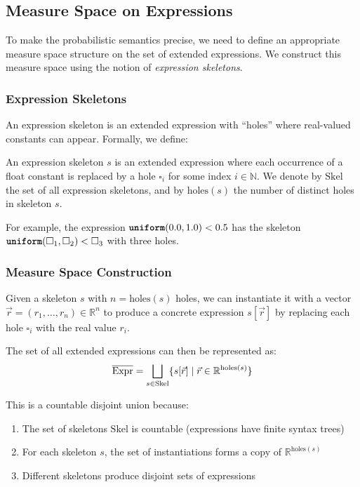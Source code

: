 \subsection{Measure Space on Expressions}

To make the probabilistic semantics precise, we need to define an appropriate measure space structure on the set of extended expressions. We construct this measure space using the notion of \emph{expression skeletons}.

\subsubsection{Expression Skeletons}

An expression skeleton is an extended expression with ``holes'' where real-valued constants can appear. Formally, we define:

\begin{definition}
An expression skeleton $s$ is an extended expression where each occurrence of a float constant is replaced by a hole $\square_i$ for some index $i \in \mathbb{N}$. We denote by $\text{Skel}$ the set of all expression skeletons, and by $\text{holes}(s)$ the number of distinct holes in skeleton $s$.
\end{definition}

For example, the expression $\textnormal{\ttfamily\bfseries uniform}(0.0, 1.0) < 0.5$ has the skeleton $\textnormal{\ttfamily\bfseries uniform}(\square_1, \square_2) < \square_3$ with three holes.

\subsubsection{Measure Space Construction}

Given a skeleton $s$ with $n = \text{holes}(s)$ holes, we can instantiate it with a vector $\vec{r} = (r_1, \ldots, r_n) \in \mathbb{R}^n$ to produce a concrete expression $s[\vec{r}]$ by replacing each hole $\square_i$ with the real value $r_i$.

The set of all extended expressions can then be represented as:
\[
{\overline{\textnormal{Expr}}} = \bigsqcup_{s \in \text{Skel}} \{s[\vec{r}] \mid \vec{r} \in \mathbb{R}^{\text{holes}(s)}\}
\]

This is a countable disjoint union because:
\begin{enumerate}
    \item The set of skeletons $\text{Skel}$ is countable (expressions have finite syntax trees)
    \item For each skeleton $s$, the set of instantiations forms a copy of $\mathbb{R}^{\text{holes}(s)}$
    \item Different skeletons produce disjoint sets of expressions
\end{enumerate}

